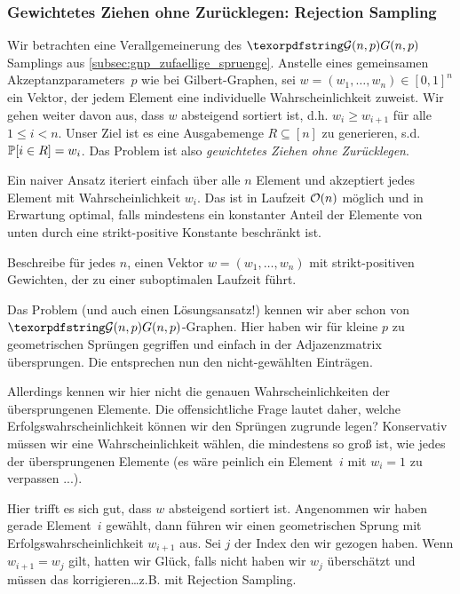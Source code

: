 \subsubsection{Gewichtetes Ziehen ohne Zurücklegen: Rejection Sampling}
Wir betrachten eine Verallgemeinerung des $\Gnp$ Samplings aus \cref{subsec:gnp_zufaellige_spruenge}.
Anstelle eines gemeinsamen Akzeptanzparameters~$p$ wie bei Gilbert-Graphen, sei $w = (w_1, \ldots, w_n) \in [0, 1]^n$ ein Vektor, der jedem Element eine individuelle Wahrscheinlichkeit zuweist.
Wir gehen weiter davon aus, dass $w$ absteigend sortiert ist, d.h. $w_i \ge w_{i+1}$ für alle $1 \le i < n$.
Unser Ziel ist es eine Ausgabemenge $R \subseteq [n]$ zu generieren, s.d. $\mathbb{P}\!\left[i \in R\right] = w_i$.
Das Problem ist also \emph{gewichtetes Ziehen ohne Zurücklegen}.

Ein naiver Ansatz iteriert einfach über alle $n$ Element und akzeptiert jedes Element mit Wahrscheinlichkeit $w_i$.
Das ist in Laufzeit $\mathcal{O}\!\left(n\right)$ möglich und in Erwartung optimal, falls mindestens ein konstanter Anteil der Elemente von unten durch eine strikt-positive Konstante beschränkt ist.
\begin{exercise}
    Beschreibe für jedes $n$, einen Vektor $w = (w_1, \ldots, w_n)$ mit strikt-positiven Gewichten, der zu einer suboptimalen Laufzeit führt.
\end{exercise}

Das Problem (und auch einen Lösungsansatz!) kennen wir aber schon von $\Gnp$-Graphen.
Hier haben wir für kleine $p$ zu geometrischen Sprüngen gegriffen und einfach  in der Adjazenzmatrix übersprungen.
Die  entsprechen nun den nicht-gewählten Einträgen.

Allerdings kennen wir hier nicht die genauen Wahrscheinlichkeiten der übersprungenen Elemente.
Die offensichtliche Frage lautet daher, welche Erfolgswahrscheinlichkeit können wir den Sprüngen zugrunde legen?
Konservativ müssen wir eine Wahrscheinlichkeit wählen, die mindestens so groß ist, wie jedes der übersprungenen Elemente (es wäre peinlich ein Element~$i$ mit $w_i = 1$ zu verpassen ...).

Hier trifft es sich gut, dass $w$ absteigend sortiert ist.
Angenommen wir haben gerade Element~$i$ gewählt, dann führen wir einen geometrischen Sprung mit Erfolgswahrscheinlichkeit $w_{i+1}$ aus.
Sei $j$ der Index den wir gezogen haben.
Wenn $w_{i+1} = w_j$ gilt, hatten wir Glück, falls nicht haben wir $w_j$ überschätzt und müssen das korrigieren\ldots z.B. mit Rejection Sampling.

